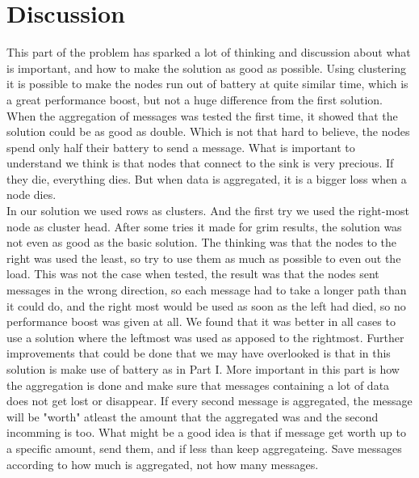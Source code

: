 \documentclass{article}
\begin{document}
  \section{Discussion}
  This part of the problem has sparked a lot of thinking and discussion about what
  is important, and how to make the solution as good as possible. Using clustering 
  it is possible to make the nodes run out of battery at quite similar time, which
  is a great performance boost, but not a huge difference from the first solution.
  When the aggregation of messages was tested the first time, it showed that the
  solution could be as good as double. Which is not that hard to believe, the nodes
  spend only half their battery to send a message. What is important to understand
  we think is that nodes that connect to the sink is very precious. If they die, 
  everything dies. But when data is aggregated, it is a bigger loss when a node
  dies.\\
  In our solution we used rows as clusters. And the first try we used the right-most
  node as cluster head. After some tries it made for grim results, the solution 
  was not even as good as the basic solution. The thinking was that the nodes
  to the right was used the least, so try to use them as much as possible to
  even out the load. This was not the case when tested, the result was that
  the nodes sent messages in the wrong direction, so each message had to take a 
  longer path than it could do, and the right most would be used as soon as the
  left had died, so no performance boost was given at all. We found that it
  was better in all cases to use a solution where the leftmost
  was used as apposed to the rightmost. Further improvements that could be done
  that we may have overlooked is that in this solution is make use of battery
  as in Part I. More important in this part is how the aggregation is done
  and make sure that messages containing a lot of data does not get lost or
  disappear. If every second message is aggregated, the message will be
  "worth" atleast the amount that the aggregated was and the second incomming
  is too. What might be a good idea is that if message get worth up to a
  specific amount, send them, and if less than keep aggregateing. Save messages
  according to how much is aggregated, not how many messages.

  
\end{document}
